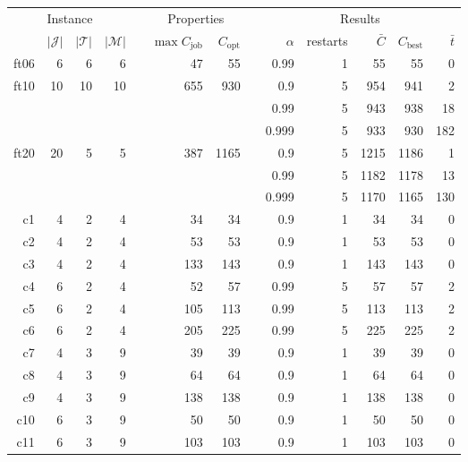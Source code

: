 \documentclass[a4paper,10pt]{article}
\begin{document}
\begin{table}[h]
\centering
\small
\begin{tabular}{@{\bfseries}rrrrrrrrrrrrr}
	\toprule
	\multicolumn{4}{c}{Instance} && \multicolumn{2}{c}{Properties} && \multicolumn{5}{c}{Results} \\
	\cmidrule(r){1-4} \cmidrule(lr){6-7} \cmidrule(lr){9-13}
	\normalfont{name} & $|\mathcal{J}|$ & $|\mathcal{T}|$ & $|\mathcal{M}|$ && $\max C_\text{job}$ &
	$C_\text{opt}$ && $\alpha$ & restarts & $\bar{C}$ & $C_\text{best}$ & $\bar{t}$ \\
	\midrule
	ft06 &  6 &  6 &  6 &&   47 &   55 &&   0.99 & 1 &   55 &   55 &    0 \\
	ft10 & 10 & 10 & 10 &&  655 &  930 &&    0.9 & 5 &  954 &  941 &    2 \\
	     &    &    &    &&      &      &&   0.99 & 5 &  943 &  938 &   18 \\
	     &    &    &    &&      &      &&  0.999 & 5 &  933 &  930 &  182 \\
	ft20 & 20 &  5 &  5 &&  387 & 1165 &&    0.9 & 5 & 1215 & 1186 &    1 \\
	     &    &    &    &&      &      &&   0.99 & 5 & 1182 & 1178 &   13 \\
	     &    &    &    &&      &      &&  0.999 & 5 & 1170 & 1165 &  130 \\[2ex]
	c1   &  4 &  2 &  4 &&   34 &   34 &&    0.9 & 1 &   34 &   34 &    0 \\
	c2   &  4 &  2 &  4 &&   53 &   53 &&    0.9 & 1 &   53 &   53 &    0 \\
	c3   &  4 &  2 &  4 &&  133 &  143 &&    0.9 & 1 &  143 &  143 &    0 \\
	c4   &  6 &  2 &  4 &&   52 &   57 &&   0.99 & 5 &   57 &   57 &    2 \\
	c5   &  6 &  2 &  4 &&  105 &  113 &&   0.99 & 5 &  113 &  113 &    2 \\
	c6   &  6 &  2 &  4 &&  205 &  225 &&   0.99 & 5 &  225 &  225 &    2 \\
	c7   &  4 &  3 &  9 &&   39 &   39 &&    0.9 & 1 &   39 &   39 &    0 \\
	c8   &  4 &  3 &  9 &&   64 &   64 &&    0.9 & 1 &   64 &   64 &    0 \\
	c9   &  4 &  3 &  9 &&  138 &  138 &&    0.9 & 1 &  138 &  138 &    0 \\
	c10  &  6 &  3 &  9 &&   50 &   50 &&    0.9 & 1 &   50 &   50 &    0 \\
	c11  &  6 &  3 &  9 &&  103 &  103 &&    0.9 & 1 &  103 &  103 &    0 \\

\end{tabular}
\end{table}
\end{document}

